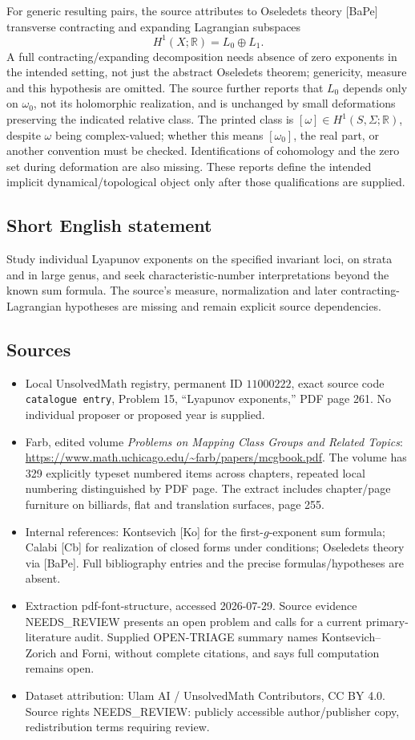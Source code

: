 \documentclass[11pt]{article}
\newcommand{\R}{\mathbb{R}}
\begin{document}
For generic resulting pairs, the source attributes to Oseledets theory [BaPe] transverse contracting and expanding Lagrangian subspaces
\[
 H^1(X;\R)=L_0\oplus L_1.
\]
A full contracting/expanding decomposition needs absence of zero exponents in the intended setting, not just the abstract Oseledets theorem; genericity, measure and this hypothesis are omitted. The source further reports that \(L_0\) depends only on \(\omega_0\), not its holomorphic realization, and is unchanged by small deformations preserving the indicated relative class. The printed class is \([\omega]\in H^1(S,\Sigma;\R)\), despite \(\omega\) being complex-valued; whether this means \([\omega_0]\), the real part, or another convention must be checked. Identifications of cohomology and the zero set during deformation are also missing. These reports define the intended implicit dynamical/topological object only after those qualifications are supplied.
\subsection{Short English statement}
Study individual Lyapunov exponents on the specified invariant loci, on strata and in large genus, and seek characteristic-number interpretations beyond the known sum formula. The source's measure, normalization and later contracting-Lagrangian hypotheses are missing and remain explicit source dependencies.
\subsection{Sources}
\begin{itemize}
\item Local UnsolvedMath registry, permanent ID \(11000222\), exact source code \texttt{catalogue entry}, Problem 15, ``Lyapunov exponents,'' PDF page 261. No individual proposer or proposed year is supplied.
\item Farb, edited volume \emph{Problems on Mapping Class Groups and Related Topics}: \url{https://www.math.uchicago.edu/~farb/papers/mcgbook.pdf}. The volume has 329 explicitly typeset numbered items across chapters, repeated local numbering distinguished by PDF page. The extract includes chapter/page furniture on billiards, flat and translation surfaces, page 255.
\item Internal references: Kontsevich [Ko] for the first-\(g\)-exponent sum formula; Calabi [Cb] for realization of closed forms under conditions; Oseledets theory via [BaPe]. Full bibliography entries and the precise formulas/hypotheses are absent.
\item Extraction pdf-font-structure, accessed 2026-07-29. Source evidence NEEDS\_REVIEW presents an open problem and calls for a current primary-literature audit. Supplied OPEN-TRIAGE summary names Kontsevich--Zorich and Forni, without complete citations, and says full computation remains open.
\item Dataset attribution: Ulam AI / UnsolvedMath Contributors, CC BY 4.0. Source rights NEEDS\_REVIEW: publicly accessible author/publisher copy, redistribution terms requiring review.
\end{itemize}
\end{document}
